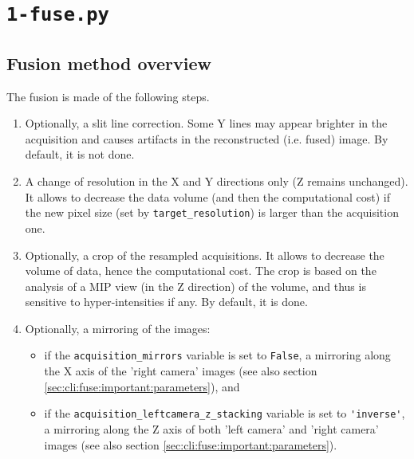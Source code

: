 \section{\texttt{1-fuse.py}}
\label{sec:cli:fuse}

\subsection{Fusion method overview}

The fusion is made of the following steps.
\begin{enumerate}
\itemsep -0.5ex
\item \label{it:fusion:slit:line} Optionally, a slit line correction. Some Y lines may appear brighter in the acquisition and causes artifacts in the reconstructed (i.e. fused) image. By default, it is not done.

\item A change of resolution in the X and Y directions only (Z remains unchanged). It allows to decrease the data volume (and then the computational cost) if the new pixel size (set by \verb|target_resolution|) is larger than the acquisition one.

\item \label{it:fusion:crop:1} Optionally, a crop of the resampled acquisitions. It allows to decrease the volume of data, hence the computational cost. The crop is based on the analysis of a MIP view (in the Z direction) of  the volume, and thus is sensitive to hyper-intensities if any. By default, it is done.

\item Optionally, a mirroring of the images:
\begin{itemize}
\item if the \verb|acquisition_mirrors| variable is set to \verb|False|, a mirroring along the X axis of the 'right camera' images (see also section \ref{sec:cli:fuse:important:parameters}), and
\item if the \verb|acquisition_leftcamera_z_stacking| variable is set to \verb|'inverse'|, a mirroring along the Z axis of both 'left camera' and 'right camera' images (see also section \ref{sec:cli:fuse:important:parameters}).
\end{itemize}


\end{enumerate}
